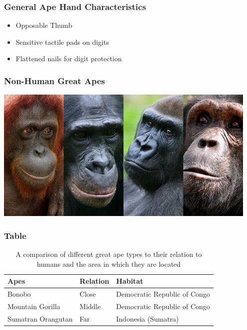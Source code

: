\documentclass[12pt]{beamer}\usepackage[]{graphicx}\usepackage[]{color}
\begin{document}
\begin{frame}
\frametitle{General Ape Hand Characteristics}
\begin{itemize}
\item<1-> Opposable Thumb
\item<2-> Sensitive tactile pads on digits
\item<3-> Flattened nails for digit protection
\end{itemize}
\end{frame}

\begin{frame}
\frametitle{Non-Human Great Apes}
   \includegraphics[width=1.0\linewidth]{great apes.jpg}
\end{frame}

\begin{frame}
\frametitle{Table}
\begin{table}
\begin{tabular}{l l l}
\toprule
\textbf{Apes} & \textbf{Relation} & \textbf{Habitat}\\
\midrule
Bonobo & Close & Democratic Republic of Congo \\
Mountain Gorilla & Middle & Democratic Republic of Congo \\
Sumatran Orangutan & Far & Indonesia (Sumatra) \\
\bottomrule
\end{tabular}
\caption{A comparison of different great ape types to their relation to humans and the area in which they are located}
\end{table}
\end{frame}
\end{document}
